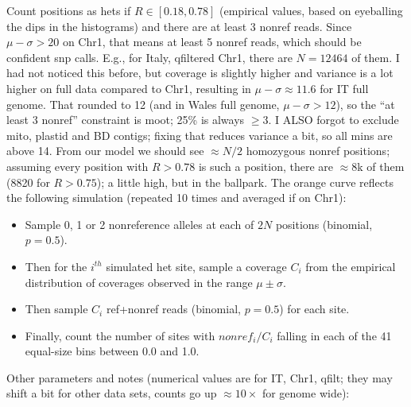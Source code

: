 \documentclass{article}\usepackage[]{graphicx}\usepackage[]{color}
\begin{document}
\noindent 
Count positions as hets if $R \in [0.18,0.78]$ (empirical values, based on eyeballing the dips in the histograms) and there are at least 3 nonref reads.
Since $\mu-\sigma > 20$ on Chr1, that means at least 5 nonref reads, which should be confident snp calls. 
E.g., for Italy, qfiltered Chr1, there are $N=12464$ of them.  
I had not noticed this before, but coverage is slightly higher and variance is a lot higher on full data compared to Chr1, resulting in $\mu-\sigma \approx 11.6$ for IT full genome. That rounded to 12 (and in Wales full genome, $\mu-\sigma>12$), so the ``at least 3 nonref'' constraint is moot;  25\% is always $\ge 3$.
I ALSO forgot to exclude mito, plastid and BD contigs; fixing that reduces variance a bit, so all mins are above 14.
From our model we should see $\approx N/2$ homozygous nonref positions; assuming every position with $R>0.78$ is such a position, there are $\approx 8$k of them (8820 for $R>0.75$); a little high, but in the ballpark.
The orange curve reflects the following simulation (repeated 10 times and averaged if on Chr1):
\begin{itemize}
  \item Sample 0, 1 or 2 nonreference alleles at each of $2 N$ positions (binomial, $p=0.5$).
  \item Then for the $i^{th}$ simulated het site, sample a coverage $C_i$ from the empirical distribution of coverages observed in the range $\mu \pm \sigma$.
  \item Then sample $C_i$ ref+nonref reads (binomial, $p=0.5$) for each site.
  \item Finally, count the number of sites with $nonref_i/C_i$ falling in each of the 41 equal-size bins between 0.0 and 1.0.    
\end{itemize}
Other parameters and notes (numerical values are for IT, Chr1, qfilt; they may shift a bit for other data sets, counts go up $\approx 10\times$ for genome wide):
\end{document}
